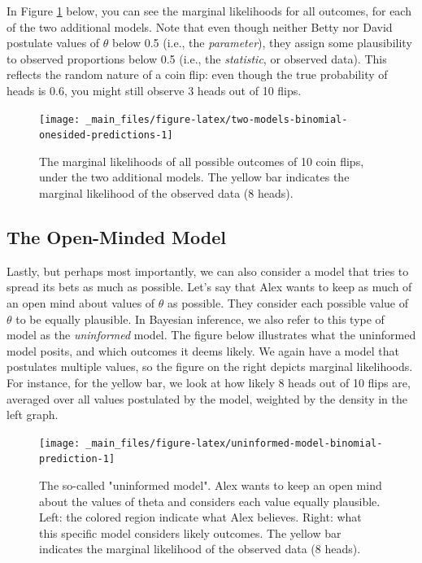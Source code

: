 \documentclass[
]{book}
\begin{document}
In Figure \ref{fig:two-models-binomial-onesided-predictions} below, you can see the marginal likelihoods for all outcomes, for each of the two additional models. Note that even though neither Betty nor David postulate values of \(\theta\) below 0.5 (i.e., the \emph{parameter}), they assign some plausibility to observed proportions below 0.5 (i.e., the \emph{statistic}, or observed data). This reflects the random nature of a coin flip: even though the true probability of heads is \(0.6\), you might still observe 3 heads out of 10 flips.

\begin{figure}

{\centering \texttt{[image: \_main\_files/figure-latex/two-models-binomial-onesided-predictions-1]} 

}

\caption{The marginal likelihoods of all possible outcomes of 10 coin flips, under the two additional models. The yellow bar indicates the marginal likelihood of the observed data (8 heads).}\label{fig:two-models-binomial-onesided-predictions}
\end{figure}

\hypertarget{open-minded-model-section}{%
\subsection{The Open-Minded Model}\label{open-minded-model-section}}

Lastly, but perhaps most importantly, we can also consider a model that tries to spread its bets as much as possible. Let's say that Alex wants to keep as much of an open mind about values of \(\theta\) as possible. They consider each possible value of \(\theta\) to be equally plausible. In Bayesian inference, we also refer to this type of model as the \emph{uninformed} model. The figure below illustrates what the uninformed model posits, and which outcomes it deems likely. We again have a model that postulates multiple values, so the figure on the right depicts marginal likelihoods. For instance, for the yellow bar, we look at how likely 8 heads out of 10 flips are, averaged over all values postulated by the model, weighted by the density in the left graph.

\begin{figure}

{\centering \texttt{[image: \_main\_files/figure-latex/uninformed-model-binomial-prediction-1]} 

}

\caption{The so-called "uninformed model". Alex wants to keep an open mind about the values of theta and considers each value equally plausible. Left: the colored region indicate what Alex believes. Right: what this specific model considers likely outcomes. The yellow bar indicates the marginal likelihood of the observed data (8 heads).}\label{fig:uninformed-model-binomial-prediction}
\end{figure}
\end{document}
